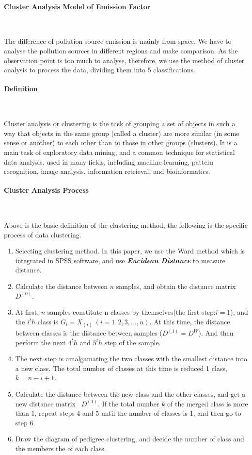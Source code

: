 \documentclass[a4paper,11pt]{article}
\begin{document}
\paragraph{Cluster Analysis Model of Emission Factor}
\textrm{\\}
\par The difference of pollution source emission is mainly from space. We have to analyse the pollution sources in different regions and make comparison. As the observation point is too much to analyse, therefore, we use the method of cluster analysis to process the data, dividing them into 5 classifications.
\paragraph{Definition}
\textrm{\\}
\par Cluster analysis or clustering is the task of grouping a set of objects in such a way that objects in the same group (called a cluster) are more similar (in some sense or another) to each other than to those in other groups (clusters). It is a main task of exploratory data mining, and a common technique for statistical data analysis, used in many fields, including machine learning, pattern recognition, image analysis, information retrieval, and bioinformatics.
\paragraph{Cluster Analysis Process}
\textrm{\\}
\par Above is the basic definition of the clustering method, the following is the specific process of data clustering.
\begin{enumerate}%
\renewcommand{\labelenumi}{(\theenumi)}
    \item Selecting clustering method. In this paper, we use the Ward method which is integrated in SPSS \cite{RC} software, and use \textbf{\emph{Eucidean Distance}} to measure distance. 
    \item Calculate the distance between $n$ samples, and obtain the distance matrix $D^(0)$.
    \item At first, $n$ samples constitute n classes by themselves(the first step:$i=1$), and the $i^th$ class is $G_i={X_{(i)}}~(i=1,2,3,...,n)$. At this time, the distance between classes is the distance between samples ($D^{(1)}=D^W$). And then perform the next $4^th$ and $5^th$ step of the sample.
    \item The next step is amalgamating the two classes with the smallest distance into a new class. The total number of classes at this time is reduced 1 class, ~$k=n-i+1$.
    \item Calculate the distance between the new class and the other classes, and get a new distance matrix ~$D^{(1)}$. If the total number $k$ of the merged class is more than 1, repeat steps 4 and 5 until the number of classes is 1, and then go to step 6.
    \item Draw the diagram of pedigree clustering, and decide the number of class and the members the of each class.
\end{enumerate}
\end{document}
